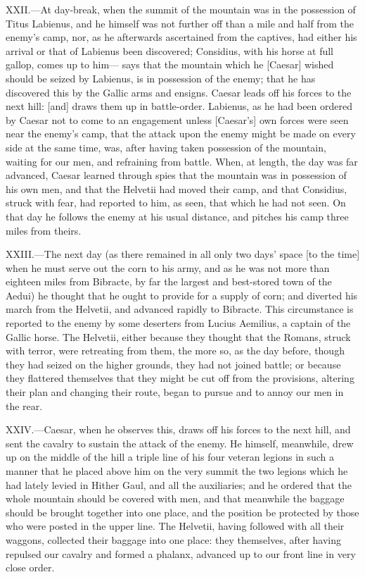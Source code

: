 XXII.—At day-break, when the summit of the mountain was in the
possession of Titus Labienus, and he himself was not further off than a
mile and half from the enemy's camp, nor, as he afterwards ascertained
from the captives, had either his arrival or that of Labienus been
discovered; Considius, with his horse at full gallop, comes up to him—
says that the mountain which he [Caesar] wished should be seized by
Labienus, is in possession of the enemy; that he has discovered this by
the Gallic arms and ensigns. Caesar leads off his forces to the next
hill: [and] draws them up in battle-order. Labienus, as he had been
ordered by Caesar not to come to an engagement unless [Caesar's] own
forces were seen near the enemy's camp, that the attack upon the enemy
might be made on every side at the same time, was, after having taken
possession of the mountain, waiting for our men, and refraining from
battle. When, at length, the day was far advanced, Caesar learned
through spies that the mountain was in possession of his own men, and
that the Helvetii had moved their camp, and that Considius, struck with
fear, had reported to him, as seen, that which he had not seen. On that
day he follows the enemy at his usual distance, and pitches his camp
three miles from theirs.

XXIII.—The next day (as there remained in all only two days' space [to
the time] when he must serve out the corn to his army, and as he was not
more than eighteen miles from Bibracte, by far the largest and best-stored
town of the Aedui) he thought that he ought to provide for a
supply of corn; and diverted his march from the Helvetii, and advanced
rapidly to Bibracte. This circumstance is reported to the enemy by some
deserters from Lucius Aemilius, a captain of the Gallic horse. The
Helvetii, either because they thought that the Romans, struck with
terror, were retreating from them, the more so, as the day before,
though they had seized on the higher grounds, they had not joined
battle; or because they flattered themselves that they might be cut off
from the provisions, altering their plan and changing their route, began
to pursue and to annoy our men in the rear.

XXIV.—Caesar, when he observes this, draws off his forces to the next
hill, and sent the cavalry to sustain the attack of the enemy. He
himself, meanwhile, drew up on the middle of the hill a triple line of
his four veteran legions in such a manner that he placed above him on
the very summit the two legions which he had lately levied in Hither
Gaul, and all the auxiliaries; and he ordered that the whole mountain
should be covered with men, and that meanwhile the baggage should be
brought together into one place, and the position be protected by those
who were posted in the upper line. The Helvetii, having followed with
all their waggons, collected their baggage into one place: they
themselves, after having repulsed our cavalry and formed a phalanx,
advanced up to our front line in very close order.

